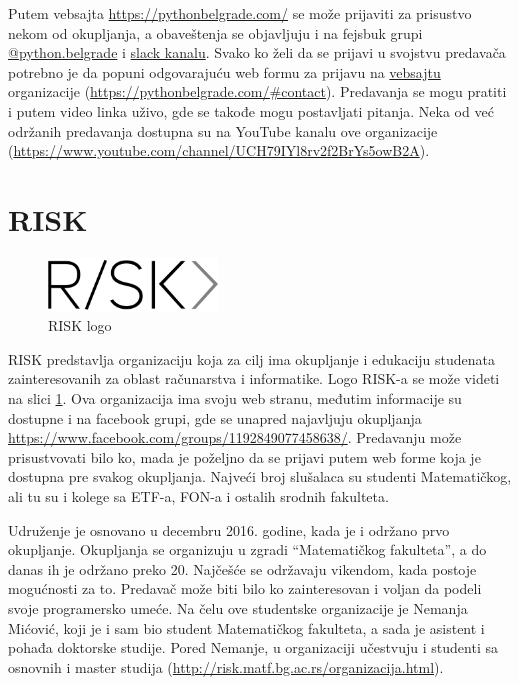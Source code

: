 \documentclass[a4paper]{article}
\begin{document}
{Putem vebsajta \url{https://pythonbelgrade.com/} se može prijaviti za prisustvo nekom od okupljanja, a obaveštenja se objavljuju i na fejsbuk grupi \href{https://www.facebook.com/python.belgrade/}{@python.belgrade} i \href{https://pythonbelgrade.slack.com/join/shared_invite/enQtNTM0OTI4NzY3NDI2LTk2OThkNjQ2YmM5NWNkNTBjMjU3NDY0NjcyNDFiYmZmNjQ4MDE3NjczYWM0NTk1YWVlYzlhNGIwYjU3NjA3Y2Y}{slack kanalu}. Svako ko želi da se prijavi u svojstvu predavača potrebno je da popuni odgovarajuću web formu za prijavu na \href{https://pythonbelgrade.com/}{vebsajtu} organizacije (\url{https://pythonbelgrade.com/#contact}). Predavanja se mogu pratiti i putem video linka uživo, gde se takođe mogu postavljati pitanja. Neka od već održanih predavanja dostupna su na YouTube kanalu ove organizacije (\url{https://www.youtube.com/channel/UCH79IYl8rv2f2BrYs5owB2A}).


\section{RISK}
\label{sec:riskmatf}

\begin{figure}[h!]
  \centering
  \includegraphics[width=0.4\textwidth]{riskmatf.png}
  \caption{RISK logo}
  \label{fig:RISKlogo}
\end{figure}

RISK predstavlja organizaciju koja za cilj ima okupljanje i edukaciju studenata zainteresovanih za oblast računarstva i informatike. \cite{aboutRisk}
Logo RISK-a se može videti na slici \ref{fig:RISKlogo}. Ova organizacija ima svoju web stranu, međutim informacije su dostupne i na facebook grupi, gde se unapred najavljuju okupljanja \url{https://www.facebook.com/groups/1192849077458638/}. Predavanju može prisustvovati bilo ko, mada je poželjno da se prijavi putem web forme koja je dostupna pre svakog okupljanja. Najveći broj slušalaca su
studenti Matematičkog, ali tu su i kolege sa ETF-a, FON-a i ostalih srodnih fakulteta.

Udruženje je osnovano u decembru 2016. godine, kada je i održano prvo okupljanje. Okupljanja se organizuju u zgradi ``Matematičkog fakulteta'', a do danas ih je održano preko 20. Najčešće se održavaju vikendom, kada postoje mogućnosti za to. Predavač može biti bilo ko zainteresovan i voljan da podeli svoje programersko umeće. Na čelu ove studentske organizacije je Nemanja Mićović, koji je i sam bio student Matematičkog fakulteta, a sada je asistent i pohađa doktorske studije. Pored Nemanje, u organizaciji učestvuju i studenti sa osnovnih i master studija (\url{http://risk.matf.bg.ac.rs/organizacija.html}).

}
\end{document}
